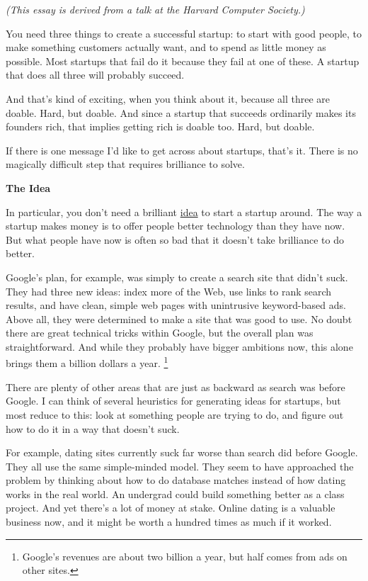 \documentclass[12pt]{book}
\begin{document}
\emph{(This essay is derived from a talk at the Harvard Computer
Society.)}

You need three things to create a successful startup: to start with good
people, to make something customers actually want, and to spend as
little money as possible. Most startups that fail do it because they
fail at one of these. A startup that does all three will probably
succeed.

And that's kind of exciting, when you think about it, because all three
are doable. Hard, but doable. And since a startup that succeeds
ordinarily makes its founders rich, that implies getting rich is doable
too. Hard, but doable.

If there is one message I'd like to get across about startups, that's
it. There is no magically difficult step that requires brilliance to
solve.

\textbf{The Idea}

In particular, you don't need a brilliant \href{ideas.html}{idea} to
start a startup around. The way a startup makes money is to offer people
better technology than they have now. But what people have now is often
so bad that it doesn't take brilliance to do better.

Google's plan, for example, was simply to create a search site that
didn't suck. They had three new ideas: index more of the Web, use links
to rank search results, and have clean, simple web pages with
unintrusive keyword-based ads. Above all, they were determined to make a
site that was good to use. No doubt there are great technical tricks
within Google, but the overall plan was straightforward. And while they
probably have bigger ambitions now, this alone brings them a billion
dollars a year. \footnote{Google's revenues are about two billion a year, but half comes
from ads on other sites.}

There are plenty of other areas that are just as backward as search was
before Google. I can think of several heuristics for generating ideas
for startups, but most reduce to this: look at something people are
trying to do, and figure out how to do it in a way that doesn't suck.

For example, dating sites currently suck far worse than search did
before Google. They all use the same simple-minded model. They seem to
have approached the problem by thinking about how to do database matches
instead of how dating works in the real world. An undergrad could build
something better as a class project. And yet there's a lot of money at
stake. Online dating is a valuable business now, and it might be worth a
hundred times as much if it worked.
\end{document}
